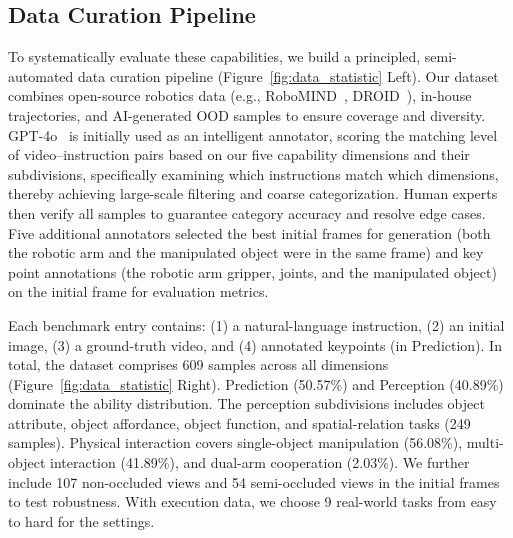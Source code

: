 
\subsection{Data Curation Pipeline}
\label{ssec:data_curation}
To systematically evaluate these capabilities, we build a principled, semi-automated data curation pipeline (Figure~\ref{fig:data_statistic} Left). Our dataset combines open-source robotics data (e.g., RoboMIND~\cite{wu2025robomind}, DROID~\cite{khazatsky2024droid}), in-house trajectories, and AI-generated OOD samples to ensure coverage and diversity. GPT-4o~\cite{hurst2024gpt} is initially used as an intelligent annotator, scoring the matching level of video–instruction pairs based on our five capability dimensions and their subdivisions, specifically examining which instructions match which dimensions, thereby achieving large-scale filtering and coarse categorization. Human experts then verify all samples to guarantee category accuracy and resolve edge cases. Five additional annotators selected the best initial frames for generation (both the robotic arm and the manipulated object were in the same frame) and key point annotations (the robotic arm gripper, joints, and the manipulated object) on the initial frame for evaluation metrics.

Each benchmark entry contains: (1) a natural-language instruction, (2) an initial image, (3) a ground-truth video, and (4) annotated keypoints (in Prediction). In total, the dataset comprises 609 samples across all dimensions (Figure~\ref{fig:data_statistic} Right). Prediction (50.57\%) and Perception (40.89\%) dominate the ability distribution. The perception subdivisions includes object attribute, object affordance, object function, and spatial-relation tasks (249 samples). Physical interaction covers single-object manipulation (56.08\%), multi-object interaction (41.89\%), and dual-arm cooperation (2.03\%). We further include 107 non-occluded views and 54 semi-occluded views in the initial frames to test robustness. With execution data, we choose 9 real-world tasks from easy to hard for the settings.


